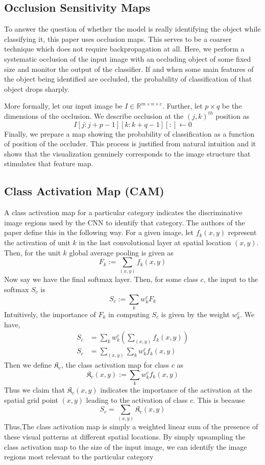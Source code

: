 \documentclass[conference]{IEEEtran}
\begin{document}
\subsection{Occlusion Sensitivity Maps}
To answer the question of whether the model is really identifying the object while classifying it, this \cite{occlusion} paper uses occlusion maps. This serves to be a coarser technique which does not require backpropagation at all. Here, we perform a systematic occlusion of the input image with an occluding object of some fixed size and monitor the output of the classifier. If and when some main features of the object being identified are occluded, the probability of classification of that object drops sharply. 

More formally, let our input image be $I \in \mathbb{R}^{m \times n \times c}$. Further, let $p \times q$ be the dimensions of the occlusion. We describe occlusion at the $(j,k)^{th}$ position as
\[I[j:j+p-1][k:k+q-1][:] \leftarrow 0\]
Finally, we prepare a map showing the probability of classification as a function of position of the occluder. This process is justified from natural intuition and it shows
that the visualization genuinely corresponds to the image structure that stimulates that feature map. 

\subsection{Class Activation Map (CAM)}
A class activation map for a particular category indicates the discriminative image regions used by the CNN to identify that category. The authors of the paper \cite{CAM} define this in the following way. For a given image, let $f_k(x,y)$ represent the activation of unit $k$ in the last convolutional layer at spatial location $(x,y)$. Then, for the unit $k$ global average pooling is given as \[F_k := \sum_{(x,y)}f_k(x,y)\]
Now say we have the final softmax layer. Then, for some class $c$, the input to the softmax $S_c$ is 
\[S_c := \sum_k w_k^cF_k\]
Intuitively, the importance of $F_k$ in computing $S_c$ is given by the weight $w_k^c$. We have,
\begin{align}
S_c &= \sum_kw_k^c\left(\sum_{(x,y)}f_k(x,y)\right) \\ 
S_c &= \sum_{(x,y)}\sum_kw_k^cf_k(x,y) 
\end{align}
Then we define $\mathfrak{K}_c$, the class activation map for class $c$ as
\[\mathfrak{K}_c(x,y) := \sum_kw_k^cf_k(x,y)\]
Thus we claim that $\mathfrak{K}_c(x,y)$ indicates the importance of the activation at the spatial grid point $(x,y)$ leading to the activation of class $c$. This is because
\[S_c = \sum_{(x,y)}\mathfrak{K}_c(x,y)\]
Thus,The class activation map is simply a weighted linear sum of the presence of these visual patterns at different spatial locations. By simply upsampling the class activation map to the size of the input image, we can identify the image regions most relevant to the particular category
\end{document}
